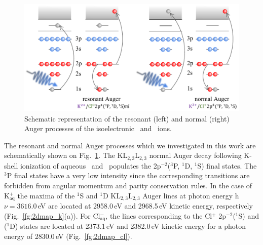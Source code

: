 \begin{figure}
\includegraphics[scale=0.8]{figures/auger_process.pdf}
\caption{Schematic representation of the resonant (left) and normal (right) Auger processes of the isoelectronic \ki~and \cli~ions.}
\label{fg:auger}
\end{figure}

The resonant and normal Auger processes which we investigated in this work are schematically shown on Fig.\ \ref{fg:auger}. The KL$_{2,3}$L$_{2,3}$ normal Auger decay following K-shell ionization of aqueous \ki~and \cli~populates the 2p$^{-2}$($^3$P, $^1$D, $^1$S) final states. The $^3$P final states have a very low intensity since the corresponding transitions are forbidden from angular momentum and parity conservation rules. In the case of K$^{+}_{\text{aq}}$ the maxima of the $^1$S and $^1$D KL$_{2,3}$L$_{2,3}$ Auger lines at photon energy h$\nu = 3616.0$\,eV are located at 2958.0\,eV and 2968.5\,eV kinetic energy, respectively (Fig.\ \ref{fg:2dmap_k}(a)). For Cl$^{-}_{\text{aq}}$, the lines corresponding to the Cl$^{+}$ 2p$^{-2}$($^1$S) and ($^1$D) states are located at 2373.1\,eV and 2382.0\,eV kinetic energy for a photon energy of 2830.0\,eV (Fig.\ \ref{fg:2dmap_cl}).


